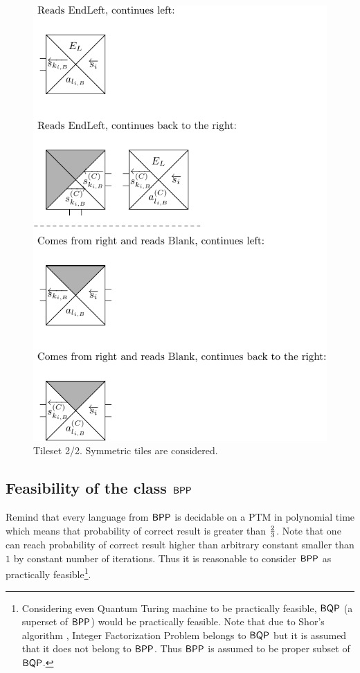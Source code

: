 	\begin{figure}[h]
	\begin{center}
		\includegraphics{./figures/tiles2.pdf}
		\caption{Tileset 2/2. Symmetric tiles are considered.}
		\label{fig:tileset2}
	\end{center}
	\end{figure}

\subsection{Feasibility of the class $\mathsf{BPP}$}
	
	Remind that every language from $\mathsf{BPP}$ is decidable on a PTM in polynomial time which means that probability of correct result is greater than $\nicefrac{2}{3}$. Note that one can reach probability of correct result higher than arbitrary constant smaller than $1$ by constant number of iterations. Thus it is reasonable to consider $\mathsf{BPP}$ as practically feasible\footnote{Considering even Quantum Turing machine to be practically feasible, $\mathsf{BQP}$ (a superset of $\mathsf{BPP}$) would be practically feasible. Note that due to Shor's algorithm \cite{shor94}, Integer Factorization Problem belongs to $\mathsf{BQP}$ but it is assumed that it does not belong to $\mathsf{BPP}$. Thus $\mathsf{BPP}$ is assumed to be proper subset of $\mathsf{BQP}$.}.
	

